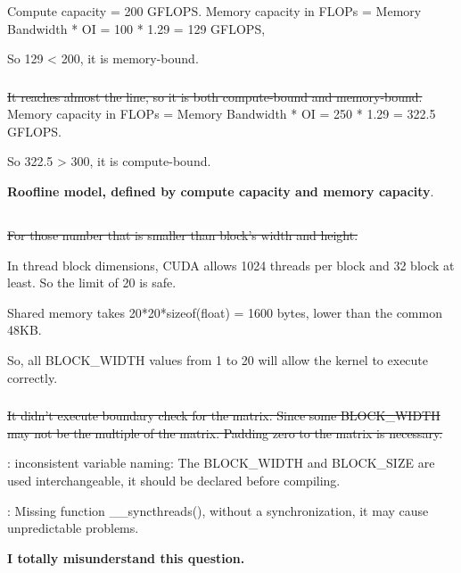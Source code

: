 \documentclass{article}
\begin{document}
Compute capacity = 200 GFLOPS.
Memory capacity in FLOPs = Memory Bandwidth * OI = 100 * 1.29 = 129 GFLOPS,

So 129 < 200, it is memory-bound.

\subsubsection{}
\sout{It reaches almost the line, so it is both compute-bound and memory-bound.}
Memory capacity in FLOPs = Memory Bandwidth * OI = 250 * 1.29 = 322.5 GFLOPS.

So 322.5 > 300, it is compute-bound.

\textbf{Roofline model, defined by compute capacity and memory capacity}.

\subsection{}
\subsubsection{}
\sout{For those number that is smaller than block's width and height.}

In thread block dimensions, CUDA allows 1024 threads per block and 32 block at least. So the limit of 20 is safe.

Shared memory takes 20*20*sizeof(float) = 1600 bytes, lower than the common 48KB.

So, all BLOCK\_WIDTH values from 1 to 20 will allow the kernel to execute correctly.


\subsubsection{}
\sout{It didn't execute boundary check for the matrix. Since some BLOCK\_WIDTH may not be the multiple of the matrix. Padding zero to the matrix is necessary.}

: inconsistent variable naming: The BLOCK\_WIDTH and BLOCK\_SIZE are used interchangeable, it should be declared before compiling.

: Missing function \_\_syncthreads(), without a synchronization, it may cause unpredictable problems.


\textbf{I totally misunderstand this question.}

\subsection{}
\end{document}
